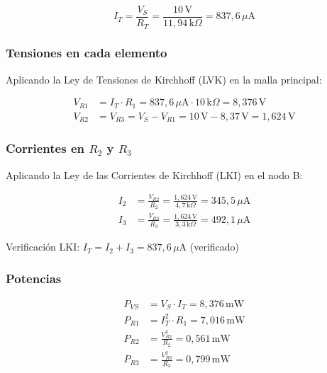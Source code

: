 \documentclass[12pt,a4paper]{article}
\begin{document}
\begin{equation}
    I_T = \frac{V_S}{R_T}
    = \frac{10\,\text{V}}{{11{,}94}\,\text{k}\Omega}
    = {837{,}6}\,\mu\text{A}
\end{equation}
 
\subsubsection{Tensiones en cada elemento}
 
Aplicando la Ley de Tensiones de Kirchhoff (LVK) en la malla principal:
 
\begin{align}
    V_{R1} &= I_T \cdot R_1 = {837{,}6}\,\mu\text{A} \cdot 10\,\text{k}\Omega = {8{,}376}\,\text{V} \\
    V_{R2} &= V_{R3} = V_S - V_{R1} = 10\,\text{V} - {8{,}37}\,\text{V} = {1{,}624}\,\text{V}
\end{align}
 
\subsubsection{Corrientes en $R_2$ y $R_3$}
 
Aplicando la Ley de las Corrientes de Kirchhoff (LKI) en el nodo B:
 
\begin{align}
    I_2 &= \frac{V_{R2}}{R_2} = \frac{1{,}624\,\text{V}}{4{,}7\,\text{k}\Omega} = 345{,}5\,\mu\text{A} \\
    I_3 &= \frac{V_{R3}}{R_3} = \frac{1{,}624\,\text{V}}{3{,}3\,\text{k}\Omega} = 492{,}1\,\mu\text{A}
\end{align}
 
Verificación LKI: $I_T = I_2 + I_3 ={837{,}6}\,\mu\text{A} $ (verificado)
 
\subsubsection{Potencias}
 
\begin{align}
    P_{VS}  &= V_S \cdot I_T                    = 8{,}376\,\text{mW} \\
    P_{R1}  &= I_T^2 \cdot R_1                  = 7{,}016\,\text{mW} \\
    P_{R2}  &= \frac{V_{R2}^2}{R_2}             = 0{,}561\,\text{mW} \\
    P_{R3}  &= \frac{V_{R3}^2}{R_3}             = 0{,}799\,\text{mW}
\end{align}
 
\end{document}
